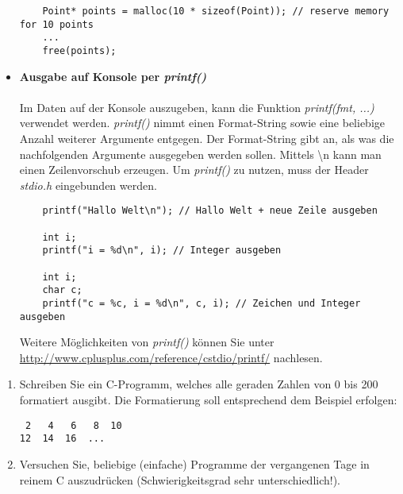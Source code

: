 \documentclass[
  accentcolor=tud1c,	%
  colorbacktitle,		%
  inverttitle,			%
  german,				%
  twoside
]{tudexercise}
\begin{document}
\begin{itemize}
\begin{lstlisting}
	Point* points = malloc(10 * sizeof(Point)); // reserve memory for 10 points
	...
	free(points);
\end{lstlisting} 

\item[] \textbf{Ausgabe auf Konsole per \emph{printf()}}\\\\
Im Daten auf der Konsole auszugeben, kann die Funktion \emph{printf(fmt, ...)} verwendet werden. \emph{printf()} nimmt einen Format-String sowie eine beliebige Anzahl weiterer Argumente entgegen. Der Format-String gibt an, als was die nachfolgenden Argumente ausgegeben werden sollen. Mittels \textbackslash n kann man einen Zeilenvorschub erzeugen. Um \emph{printf()} zu nutzen, muss der Header \emph{stdio.h} eingebunden werden. 

\begin{lstlisting}
	printf("Hallo Welt\n"); // Hallo Welt + neue Zeile ausgeben
	
	int i;
	printf("i = %d\n", i); // Integer ausgeben
	
	int i;
	char c;
	printf("c = %c, i = %d\n", c, i); // Zeichen und Integer ausgeben
\end{lstlisting} 

Weitere Möglichkeiten von \emph{printf()} können Sie unter \href{http://www.cplusplus.com/reference/cstdio/printf/}{http://www.cplusplus.com/reference/cstdio/printf/} nachlesen.

\end{itemize}

\begin{enumerate}
\item Schreiben Sie ein C-Programm, welches alle geraden Zahlen von 0 bis 200 formatiert ausgibt. Die Formatierung soll entsprechend dem Beispiel erfolgen:
\begin{lstlisting}
 2   4   6   8  10
12  14  16  ...
\end{lstlisting}

\item Versuchen Sie, beliebige (einfache) Programme der vergangenen Tage in reinem C auszudrücken (Schwierigkeitsgrad sehr unterschiedlich!).
\end{enumerate}
\end{document}
